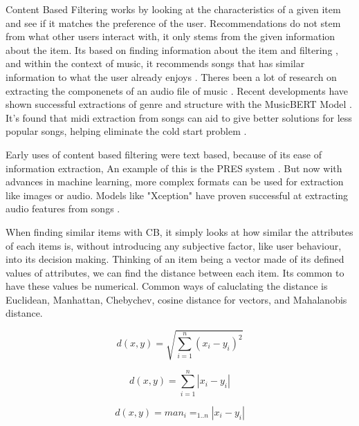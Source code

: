 Content Based Filtering works by looking at the characteristics of a given item and see if it matches the preference of the user. Recommendations do not stem from what other users interact with, it only stems from the given information about the item. Its based on finding information about the item and filtering \citep{casey_content-based_2008}, and within the context of music, it recommends songs that has similar information to what the user already enjoys \citep{aucouturier_music_2002} \citep{logan_music_2004}. Theres been a lot of research on extracting the componenets of an audio file of music \citep{ribecky_multi-input_2021} \citep{zhao_musical_2022}. Recent developments have shown successful extractions of genre and structure with the MusicBERT Model \citep{zhu_musicbert_2021}. It's found that midi extraction from songs can aid to give better solutions for less popular songs, helping eliminate the cold start problem \citep{yadav_improved_2022}.

Early uses of content based filtering were text based, because of its ease of information extraction, An example of this is the PRES system \citep{van_meteren_using_2000}. But now with advances in machine learning, more complex formats can be used for extraction like images or audio. Models like "Xception" have proven successful at extracting audio features from songs \citep{chollet_xception_2017} \citep{singh_robustness_2022}.

When finding similar items with CB, it simply looks at how similar the attributes of each items is, without introducing any subjective factor, like user behaviour, into its decision making. Thinking of an item being a vector made of its defined values of attributes, we can find the distance between each item. Its common to have these values be numerical. Common ways of caluclating the distance is Euclidean, Manhattan, Chebychev, cosine distance for vectors, and Mahalanobis distance.

\begin{equation}
	d(x,y) = \sqrt{\sum _{i=1} ^{n}(x_{i} - y_{i})^{2}}
\end{equation}

\begin{equation}
	d(x,y) = \sum _{i=1} ^{n} | x_{i} - y_{i} |
\end{equation}

\begin{equation}
	d(x,y) = man_{i} = _{1 . . n} | x_{i} - y_{i} |
\end{equation}

